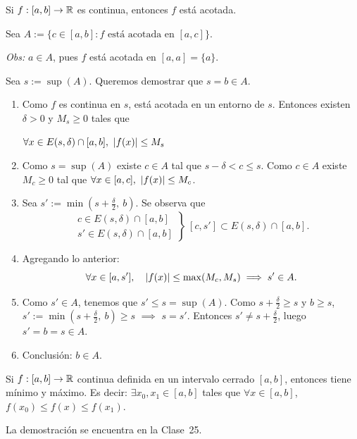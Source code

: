 \documentclass[11pt,a4paper]{article}
\begin{document}
\begin{proposicion}
Si $f:[a,b]\to\mathbb{R}$ es continua, entonces $f$ está acotada.
\end{proposicion}

\begin{demo}
Sea $A:=\{c\in[a,b] : f \text{ está acotada en } [a,c]\}$.

\textit{Obs:} $a\in A$, pues $f$ está acotada en $[a,a]=\{a\}$.

Sea $s:=\sup(A)$. Queremos demostrar que $s=b\in A$.
\begin{enumerate}[label=(\arabic*)]
  \item Como $f$ es continua en $s$, está acotada en un entorno de $s$. Entonces existen $\delta>0$ y $M_s\geq0$ tales que
  \begin{center}
 {$\forall x\in E(s,\delta)\cap[a,b],\ \abs{f(x)}\leq M_s$}
  \end{center}
  \item Como $s=\sup(A)$ existe $c\in A$ tal que $s-\delta<c\leq s$. Como $c\in A$ existe $M_c\geq0$ tal que $\forall x\in[a,c],\ \lvert f(x)\rvert\leq M_c$.
  \item Sea $s':=\min\left(s+\frac\delta2,\ b\right)$. Se observa que
  \[
    \left.\begin{array}{l} c\in E(s,\delta)\cap[a,b]\\ s'\in E(s,\delta)\cap[a,b]\end{array}\right\}
    \ [c,s']\subset E(s,\delta)\cap[a,b].
  \]
  \item Agregando lo anterior:
  \[
    \forall x\in[a,s'],\quad \lvert f(x)\rvert\leq\max(M_c,M_s)\implies s'\in A.
  \]
  \item Como $s'\in A$, tenemos que $s'\leq s=\sup(A)$. Como $s+\frac\delta2\geq s$ y $b\geq s$, $s':=\min\left(s+\frac\delta2,\ b\right)\geq s$ $\implies$ $s=s'$. Entonces $s'\neq s+\frac\delta2$, luego $s'=b=s\in A$.
  \item Conclusión: $b\in A$. \qedhere
\end{enumerate}
\end{demo}

\begin{teorema}[Weierstrass]
Si $f:[a,b]\to\mathbb{R}$ continua definida en un intervalo cerrado $[a,b]$, entonces tiene mínimo y máximo. Es decir: $\exists x_0,x_1\in[a,b]$ tales que $\forall x\in[a,b]$, $f(x_0)\leq f(x)\leq f(x_1)$.
\end{teorema}

La demostración se encuentra en la Clase~25.
\end{document}
